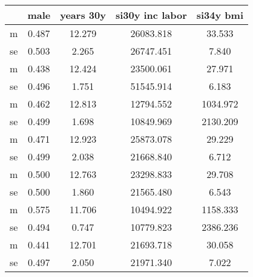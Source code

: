 \begin{table}[htbp]
\begin{tabular}{lcccc} \hline \hline
 & male  & years 30y  & si30y inc labor  & si34y bmi  \\  \hline 
m &     0.487 &    12.279 & 26083.818 &    33.533 \\  
se &     0.503 &     2.265 & 26747.451 &     7.840 \\  
m &     0.438 &    12.424 & 23500.061 &    27.971 \\  
se &     0.496 &     1.751 & 51545.914 &     6.183 \\  
m &     0.462 &    12.813 & 12794.552 &  1034.972 \\  
se &     0.499 &     1.698 & 10849.969 &  2130.209 \\  
m &     0.471 &    12.923 & 25873.078 &    29.229 \\  
se &     0.499 &     2.038 & 21668.840 &     6.712 \\  
m &     0.500 &    12.763 & 23298.833 &    29.708 \\  
se &     0.500 &     1.860 & 21565.480 &     6.543 \\  
m &     0.575 &    11.706 & 10494.922 &  1158.333 \\  
se &     0.494 &     0.747 & 10779.823 &  2386.236 \\  
m &     0.441 &    12.701 & 21693.718 &    30.058 \\  
se &     0.497 &     2.050 & 21971.340 &     7.022 \\  
\hline \hline \end{tabular}
\end{table}
